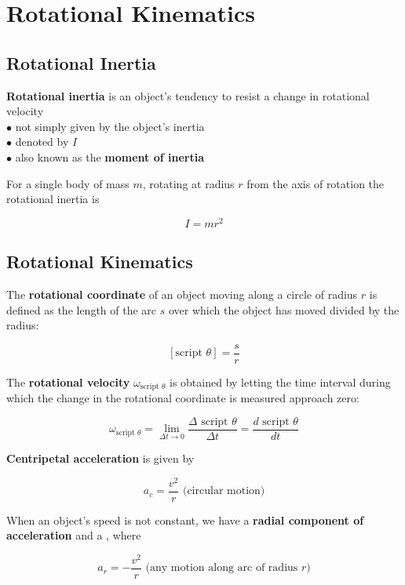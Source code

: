 \section{Rotational Kinematics}

    \subsection{Rotational Inertia}

        \textbf{Rotational inertia} is an object's tendency to resist a change in rotational velocity \\
        $\bullet$ not simply given by the object's inertia \\
        $\bullet$ denoted by $I$ \\
        $\bullet$ also known as the \textbf{moment of inertia}

        For a single body of mass $m$, rotating at radius $r$ from the axis of rotation the rotational inertia is

        \[
            I = mr^2
        \]

    \subsection{Rotational Kinematics}

        The \textbf{rotational coordinate} of an object moving along a circle of radius $r$ is defined as the length of the arc $s$ over which the object has moved divided by the radius:

        \[
            [\text{script } \theta] = \frac{s}{r}
        \]

        The \textbf{rotational velocity} $\omega_{\text{script }\theta}$ is obtained by letting the time interval during which the change in the rotational coordinate is measured approach zero:

        \[
            \omega_{\text{script }\theta} = \lim_{\Delta t\rightarrow 0} \frac{\Delta \text{ script } \theta}{\Delta t} = \frac{d\text{ script }\theta}{dt}
        \]

        \textbf{Centripetal acceleration} is given by

        \[
            a_c = \frac{v^2}{r} \text{ (circular motion)}
        \]

        When an object's speed is not constant, we have a \textbf{radial component of acceleration} and a , where

        \[
            a_r = -\frac{v^2}{r} \text{ (any motion along arc of radius $r$)}
        \]

